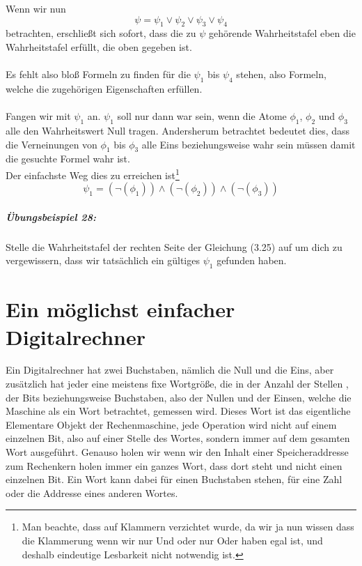 \documentclass[11pt,a4paper,leqno]{report}
\numberwithin{equation}{chapter}
\begin{document}
Wenn wir nun
\begin{equation}
	\psi = \psi_1\vee\psi_2\vee\psi_3\vee\psi_4
\end{equation}
betrachten, erschließt sich sofort, dass die zu $\psi$ gehörende Wahrheitstafel eben die Wahrheitstafel erfüllt, die oben gegeben ist.\\
\\
Es fehlt also bloß Formeln zu finden für die $\psi_1$ bis $\psi_4$ stehen, also Formeln, welche die zugehörigen Eigenschaften erfüllen.\\
\\
Fangen wir mit $\psi_1$ an. $\psi_1$ soll nur dann war sein, wenn die Atome $\phi_1$, $\phi_2$ und $\phi_3$ alle den Wahrheitswert Null tragen. Andersherum betrachtet bedeutet dies, dass die Verneinungen von $\phi_1$ bis $\phi_3$ alle Eins beziehungsweise wahr sein müssen damit die gesuchte Formel wahr ist.\\
Der einfachste Weg dies zu erreichen ist\footnote{Man beachte, dass auf Klammern verzichtet wurde, da wir ja nun wissen dass die Klammerung wenn wir nur Und oder nur Oder haben egal ist, und deshalb eindeutige Lesbarkeit nicht notwendig ist.}
\begin{equation}
	\psi_1 = (\neg(\phi_1))\wedge(\neg(\phi_2))\wedge(\neg(\phi_3))
\end{equation}
\paragraph{Übungsbeispiel 28:} Stelle die Wahrheitstafel der rechten Seite der Gleichung (3.25) auf um dich zu vergewissern, dass wir tatsächlich ein gültiges $\psi_1$ gefunden haben.



\chapter{Ein möglichst einfacher Digitalrechner}
Ein Digitalrechner hat zwei Buchstaben, nämlich die Null und die Eins, aber zusätzlich hat jeder eine meistens fixe Wortgröße, die in der Anzahl der Stellen , der Bits beziehungsweise Buchstaben, also der Nullen und der Einsen, welche die Maschine als ein Wort betrachtet, gemessen wird. Dieses Wort ist das eigentliche Elementare Objekt der Rechenmaschine, jede Operation wird nicht auf einem einzelnen Bit, also auf einer Stelle des Wortes, sondern immer auf dem gesamten Wort ausgeführt. Genauso holen wir wenn wir den Inhalt einer Speicheraddresse zum Rechenkern holen immer ein ganzes Wort, dass dort steht und nicht einen einzelnen Bit.
Ein Wort kann dabei für einen Buchstaben stehen, für eine Zahl oder die Addresse eines anderen Wortes. 
\end{document}

